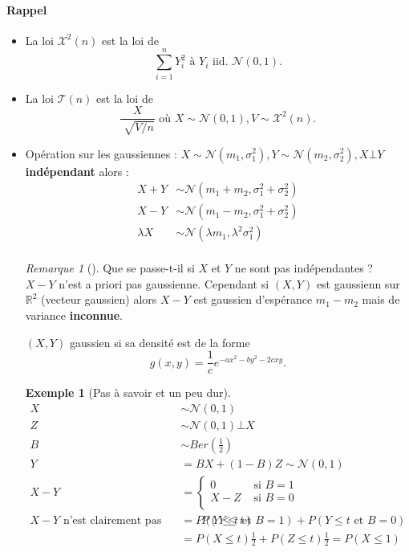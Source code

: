 \documentclass{article}
\theoremstyle{plain}%
\theoremstyle{definition}
\newtheorem{exmp}{Exemple}[section]
\theoremstyle{remark}
\newtheorem*{rem}{Remarque}
\begin{document}
\paragraph*{Rappel} \begin{itemize}
    \item La loi $ \mathcal{X}^2 (n) $ est la loi de 
    \[
        \sum_{i=1}^{n}Y_i^2 \text{ à } Y_i \text{ iid. } \mathcal{N}(0,1)
    .\]
    \item La loi $ \mathcal{T}(n) $ est la loi de 
    \[
        \frac{X}{\sqrt[]{V/n}} \text{ où } X \sim \mathcal{N}(0,1), V \sim \mathcal{X}^2(n)
    .\]
    \item Opération sur les gaussiennes : $ X \sim \mathcal{N}(m_1, \sigma_1 ^2), Y \sim \mathcal{N}(m_2, \sigma _2^2), X \bot Y $ \textbf{indépendant} alors : 
    \begin{align*}
        X + Y &\sim \mathcal{N}(m_1 + m_2, \sigma_1 ^2 + \sigma_2 ^2) \\
        X - Y &\sim \mathcal{N}(m_1 - m_2, \sigma_1 ^2 + \sigma_2 ^2) \\
        \lambda X &\sim \mathcal{N}(\lambda m_1, \lambda ^2 \sigma_1 ^2) \\
    \end{align*}
    \begin{rem}[]
        Que se passe-t-il si $ X $ et $ Y $ ne sont pas indépendantes ? \\
        $ X-Y $ n'est a priori pas gaussienne. Cependant si $ (X,Y) $ est gaussienn sur $ \mathbb{R}^2 $ (vecteur gaussien) alors $ X-Y $ est gaussien d'espérance $ m_1-m_2 $ mais de variance \textbf{inconnue}.

        $ (X,Y) $ gaussien si sa densité est de la forme 
        \[
            g(x,y) = \frac{1}{c}e^{-ax^2 - by^2 -2cxy}
        .\]
        \begin{exmp}[Pas à savoir et un peu dur]
            \begin{align*}
                X &\sim \mathcal{N}(0,1) \\
                Z &\sim \mathcal{N}(0,1) \bot X \\
                B &\sim Ber(\frac{1}{2})\\
                Y &= BX + (1-B)Z \sim \mathcal{N}(0,1 )\\
                X-Y &= \begin{cases}
                    0 &\text{ si } B=1\\
                    X-Z &\text{ si } B=0\\
                \end{cases} \\
                X - Y \text{ n'est clairement pas gaussienne}
            P(Y \leq t) &= P(Y \leq t \text{ et } B=1) + P(Y \leq t \text{ et } B =0) \\
                &= P(X \leq t) \frac{1}{2} + P(Z \leq t)\frac{1}{2} = P(X \leq 1)
            \end{align*}
        \end{exmp}
    \end{rem}
\end{itemize}
\end{document}
